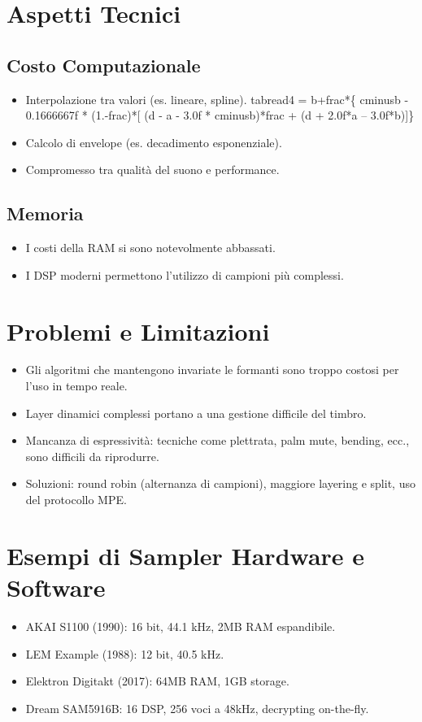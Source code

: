\section{Aspetti Tecnici}

\subsection{Costo Computazionale}

\begin{itemize}
    \item Interpolazione tra valori (es. lineare, spline).
    tabread4 = b+frac*\{ cminusb - 0.1666667f * (1.-frac)*[ (d - a - 3.0f * cminusb)*frac + (d + 
2.0f*a – 3.0f*b)]\}
    \item Calcolo di envelope (es. decadimento esponenziale).
    \item Compromesso tra qualità del suono e performance.
\end{itemize}

\subsection{Memoria}

\begin{itemize}
    \item I costi della RAM si sono notevolmente abbassati.
    \item I DSP moderni permettono l’utilizzo di campioni più complessi.
\end{itemize}

\section{Problemi e Limitazioni}

\begin{itemize}
    \item Gli algoritmi che mantengono invariate le formanti sono troppo costosi per l’uso in tempo reale.
    \item Layer dinamici complessi portano a una gestione difficile del timbro.
    \item Mancanza di espressività: tecniche come plettrata, palm mute, bending, ecc., sono difficili da riprodurre.
    \item Soluzioni: round robin (alternanza di campioni), maggiore layering e split, uso del protocollo MPE.
\end{itemize}

\section{Esempi di Sampler Hardware e Software}

\begin{itemize}
    \item AKAI S1100 (1990): 16 bit, 44.1 kHz, 2MB RAM espandibile.
    \item LEM Example (1988): 12 bit, 40.5 kHz.
    \item Elektron Digitakt (2017): 64MB RAM, 1GB storage.
    \item Dream SAM5916B: 16 DSP, 256 voci a 48kHz, decrypting on-the-fly.
\end{itemize}




